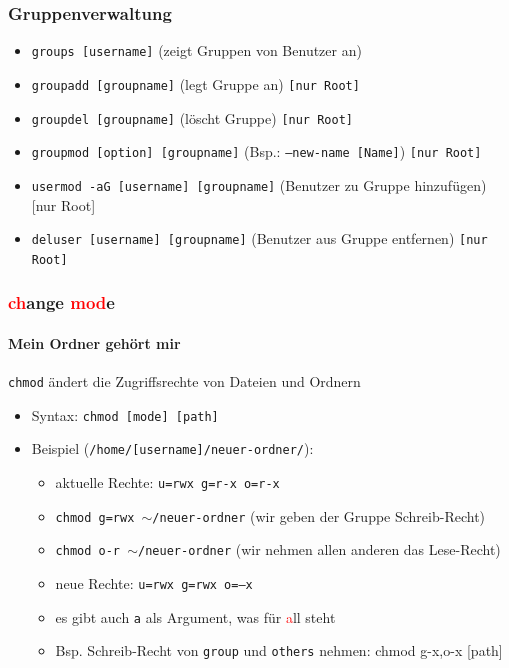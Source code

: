 \documentclass[12pt,utf8]{beamer}
\begin{document}
\begin{frame}
\frametitle{Gruppenverwaltung}
\begin{itemize}[<+->]
	\item \texttt{groups [username]} (zeigt Gruppen von Benutzer an)
	\item \texttt{groupadd [groupname]} (legt Gruppe an) \texttt{[nur Root]}
	\item \texttt{groupdel [groupname]} (löscht Gruppe) \texttt{[nur Root]}
	\item \texttt{groupmod [option] [groupname]} (Bsp.: \texttt{--new-name [Name]}) \texttt{[nur Root]}
	\item \texttt{usermod -aG [username] [groupname]} (Benutzer zu Gruppe hinzufügen) [nur Root]
	\item \texttt{deluser [username] [groupname]} (Benutzer aus Gruppe entfernen) \texttt{[nur Root]}
\end{itemize}
\end{frame}

\begin{frame}
\frametitle{\textcolor{red}{ch}ange \textcolor{red}{mod}e}
\framesubtitle{\textcolor{ownDarkOr}{Mein Ordner gehört mir}}
\texttt{chmod} ändert die Zugriffsrechte von Dateien und Ordnern
\begin{itemize}
	\item Syntax: \texttt{chmod [mode] [path]}
	\item Beispiel (\texttt{/home/[username]/neuer-ordner/}):
	\begin{itemize}[<+->]
		\item aktuelle Rechte: \texttt{u=rwx g=r-x o=r-x}
		\item \texttt{chmod g=rwx $\sim$/neuer-ordner} (wir geben der Gruppe Schreib-Recht)
		\item \texttt{chmod o-r $\sim$/neuer-ordner} (wir nehmen allen anderen das Lese-Recht)
		\item neue Rechte: \texttt{u=rwx g=rwx o=--x}
		\item es gibt auch \texttt{a} als Argument, was für \textcolor{red}{a}ll steht
		\item Bsp. Schreib-Recht von \texttt{group} und \texttt{others} nehmen: chmod g-x,o-x [path] 	
	\end{itemize}
\end{itemize}
\end{frame}
\end{document}
